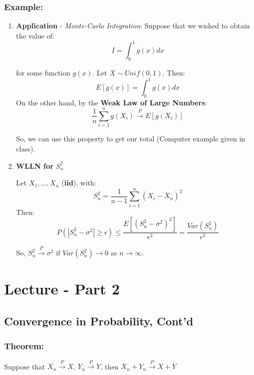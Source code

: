 \documentclass{article}
\begin{document}
\subsubsection*{Example:}
\begin{enumerate}
    \item \textbf{Application} - \textit{Monte-Carlo Integration}: Suppose that we wished to obtain the value of:
    \begin{equation*}
        I = \int_0^1 g(x)dx
    \end{equation*}
    
    for some function $g(x)$. Let $X \sim Unif(0,1)$. Then:
    \begin{equation*}
        E[g(x)] = \int_0^1 g(x)dx
    \end{equation*}
    On the other hand, by the \textbf{Weak Law of Large Numbers}:
    \begin{equation*}
        \frac{1}{n}\sum_{i=1}^n g(X_i) \xrightarrow{P} E[g(X_i)]
    \end{equation*}
    
    So, we can use this property to get our total (Computer example given in class).
    
    \item \textbf{WLLN for } $S_n^2$
    
    Let $X_1,...,X_n$ (\textbf{iid}), with:
    \begin{equation*}
        S_n^2 = \frac{1}{n-1}\sum_{i=1}^n (X_i-\overline{X}_n)^2
    \end{equation*}
    Then:
    \begin{equation*}
        P(|S_n^2 - \sigma^2| \geq \epsilon) \leq \frac{E\left[(S_n^2-\sigma^2)^2\right]}{\epsilon^2} = \frac{Var(S_n^2)}{\epsilon^2}
    \end{equation*}
    
    So, $S_n^2 \xrightarrow{P} \sigma^2$ if $Var(S_n^2)\to 0$ as $n\to\infty$.
\end{enumerate}

\section{Lecture - Part 2}

\subsection{Convergence in Probability, Cont'd}
\subsubsection{Theorem:}
Suppose that $X_n \xrightarrow{P} X$, $Y_n \xrightarrow{P} Y$, then $X_n + Y_n \xrightarrow{P} X+Y$
\end{document}
